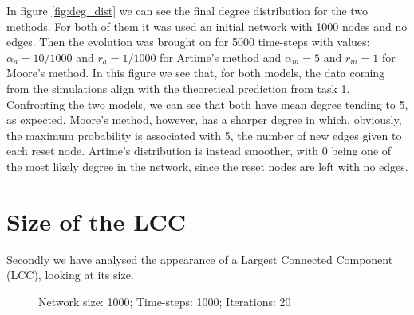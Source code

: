 In figure \ref{fig:deg_dist} we can see the final degree distribution for the two methods. For both of them it was used an initial network with 1000 nodes and no edges. Then the evolution was brought on for 5000 time-steps with values: $\alpha_a = 10/1000$ and $r_a=1/1000$ for Artime's method and $\alpha_m = 5$ and $r_m=1$ for Moore's method.
In this figure we see that, for both models, the data coming from the simulations align with the theoretical prediction from task 1.
Confronting the two models, we can see that both have mean degree tending to 5, as expected. Moore's method, however, has a sharper degree in which, obviously, the maximum probability is associated with 5, the number of new edges given to each reset node. Artime's distribution is instead smoother, with 0 being one of the most likely degree in the network, since the reset nodes are left with no edges.



\section{Size of the LCC}

Secondly we have analysed the appearance of a Largest Connected Component (LCC), looking at its size.


\begin{figure}[h!t]
\centering
    

    \caption{Network size: 1000; Time-steps: 1000; Iterations: 20}
    \label{fig:lcc}
\end{figure}

